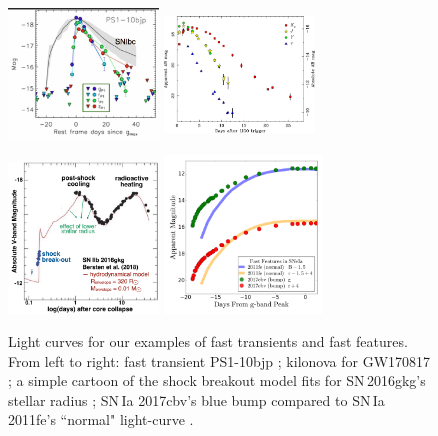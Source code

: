\documentclass[12pt, letterpaper]{article}
\begin{document}
\begin{center}
\begin{figure}[!h]
\includegraphics[width=4cm,height=4cm]{figures/Drout_PS1-10bjp.png}
\includegraphics[width=4cm,height=4cm]{figures/Tanvir_fig2.jpg}
\includegraphics[width=4cm,height=4cm]{figures/2016gkg.pdf}
\includegraphics[width=4.2cm,height=4.2cm]{figures/bluebump.png}
\caption{{\footnotesize Light curves for our examples of fast transients and fast features. From left to right: fast transient PS1-10bjp \citep{2014ApJ...794...23D}; kilonova for GW170817 \citep{2017ApJ...848L..27T}; a simple cartoon of the shock breakout model fits for SN\,2016gkg's stellar radius \citep{2018Natur.554..497B}; SN\,Ia 2017cbv's blue bump compared to SN\,Ia 2011fe's ``normal" light-curve \citep{2017ApJ...845L..11H,2015MNRAS.446.2073G}. }}
\end{figure}
\end{center}
\end{document}
